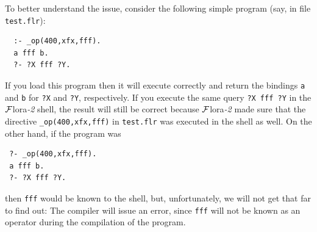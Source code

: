 \documentclass[11pt]{article}
\newcommand{\FLORA}{{\mbox{\sc ${\cal F}${lora}\rm\emph{-2}}}\xspace}
\begin{document}
To better understand the issue, consider the following simple program
(say, in file {\tt test.flr}):
\begin{verbatim}
  :- _op(400,xfx,fff).
  a fff b.
  ?- ?X fff ?Y.
\end{verbatim}
If you load this program then it will execute correctly and return the
bindings {\tt a} and {\tt b} for {\tt ?X} and {\tt ?Y}, respectively.
If you execute the same query {\tt ?X fff ?Y} in the \FLORA shell,
the result will still be correct because \FLORA made sure that the
directive {\tt \_op(400,xfx,fff)} in
{\tt test.flr} was executed in the shell as well.
On the other hand, if the program was
\begin{verbatim}
 ?- _op(400,xfx,fff).
 a fff b.
 ?- ?X fff ?Y.
\end{verbatim}
then {\tt fff} would be known to the shell, but, unfortunately, we
will not get that far to find out: The compiler will issue an error, since
{\tt fff} will not be known as an operator during the compilation of the
program.
\end{document}
